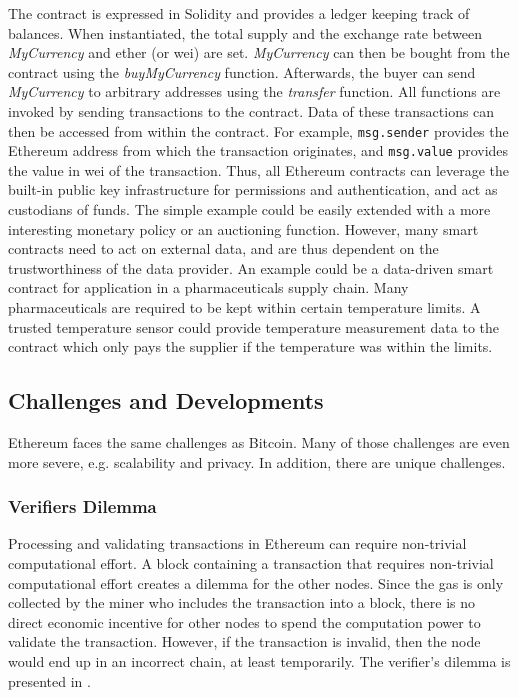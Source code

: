 {The contract is expressed in Solidity and provides a ledger keeping track of balances. When instantiated, the total supply and the exchange rate between \emph{MyCurrency} and ether (or wei) are set. \emph{MyCurrency} can then be bought from the contract using the \emph{buyMyCurrency} function. Afterwards, the buyer can send \emph{MyCurrency} to arbitrary addresses using the \emph{transfer} function. All functions are invoked by sending transactions to the contract. Data of these transactions can then be accessed from within the contract. For example, \texttt{msg.sender} provides the Ethereum address from which the transaction originates, and \texttt{msg.value} provides the value in wei of the transaction. Thus, all Ethereum contracts can leverage the built-in public key infrastructure for permissions and authentication, and act as custodians of funds. The simple example could be easily extended with a more interesting monetary policy or an auctioning function. However, many smart contracts need to act on external data, and are thus dependent on the trustworthiness of the data provider. An example could be a data-driven smart contract for application in a pharmaceuticals supply chain. Many pharmaceuticals are required to be kept within certain temperature limits. A trusted temperature sensor could provide temperature measurement data to the contract which only pays the supplier if the temperature was within the limits. 


\subsection{Challenges and Developments}

Ethereum faces the same challenges as Bitcoin. Many of those challenges are even more severe, e.g. scalability and privacy. In addition, there are unique challenges.

\subsubsection{Verifiers Dilemma}
Processing and validating transactions in Ethereum can require non-trivial computational effort.
A block containing a transaction that requires non-trivial computational effort creates a dilemma for the other nodes. Since the gas is only collected by the miner who includes the transaction into a block, there is no direct economic incentive for other nodes to spend the computation power to validate the transaction. However, if the transaction is invalid, then the node would end up in an incorrect chain, at least temporarily.
The verifier's dilemma is presented in \parencite{Luu:2015:DIC:2810103.2813659}.

}

